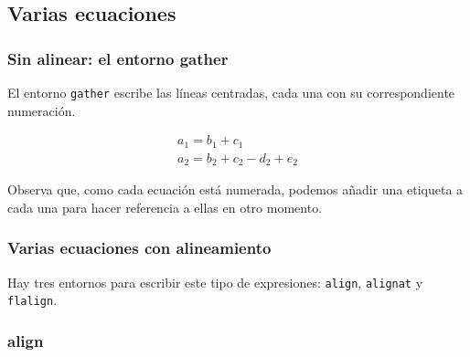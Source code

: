 \documentclass{article}
\numberwithin{equation}{section}
\theoremstyle{plain}
\theoremstyle{definition}
\theoremstyle{remark}
\begin{document}
\subsection{Varias ecuaciones}

\subsubsection{Sin alinear: el entorno gather}

El entorno \texttt{gather} escribe las líneas centradas, cada una con su correspondiente numeración.
\begin{codigo-lado}
\begin{gather}
a_1 = b_1 + c_1 \label{eq:gather1}\\
a_2 = b_2 + c_2 - d_2 + e_2 \label{eq:gather2}
\end{gather}
\end{codigo-lado}
Observa que, como cada ecuación está numerada, podemos añadir una etiqueta a cada una para hacer referencia a ellas en otro momento.

\subsubsection{Varias ecuaciones con alineamiento}

Hay tres entornos para escribir este tipo de expresiones: \texttt{align}, \texttt{alignat} y \texttt{flalign}. 

\subsubsection{align}
\end{document}
